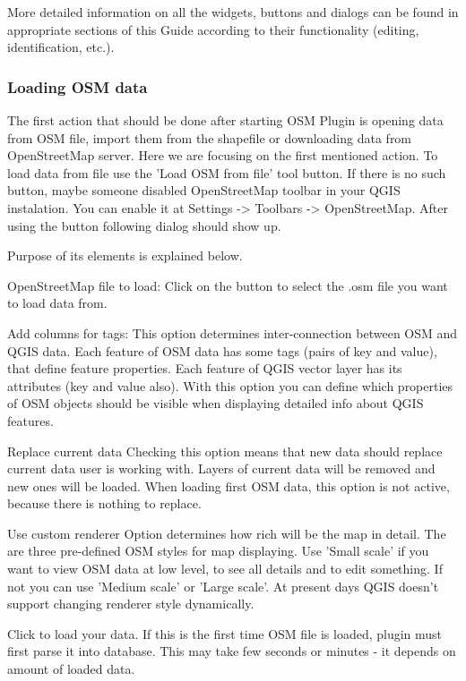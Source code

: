 More detailed information on all the widgets, buttons and dialogs can be
found in appropriate sections of this Guide according to their functionality
(editing, identification, etc.).

\subsubsection{Loading OSM data}

The first action that should be done after starting OSM Plugin is opening
data from OSM file, import them from the shapefile or downloading data from
OpenStreetMap server. Here we are focusing on the first mentioned action.
To load data from file use the 'Load OSM from file' tool button. If there
is no such button, maybe someone disabled OpenStreetMap toolbar in your QGIS
instalation. You can enable it at Settings -> Toolbars -> OpenStreetMap.
After using the button following dialog should show up.

Purpose of its elements is explained below.

\begin{description}
\item OpenStreetMap file to load: Click on the button to select the .osm file you want to load data from.
\item Add columns for tags: This option determines inter-connection between OSM and QGIS data. Each
feature of OSM data has some tags (pairs of key and value), that define
feature properties. Each feature of QGIS vector layer has its attributes (key
and value also). With this option you can define which properties of OSM
objects should be visible when displaying detailed info about QGIS features.
\item Replace current data
Checking this option means that new data should replace current data user is
working with. Layers of current data will be removed and new ones will be
loaded. When loading first OSM data, this option is not active, because there
is nothing to replace.
\item Use custom renderer
Option determines how rich will be the map in detail. The are three
pre-defined OSM styles for map displaying. Use 'Small scale' if you want to
view OSM data at low level, to see all details and to edit something. If not
you can use 'Medium scale' or 'Large scale'. At present days QGIS doesn't
support changing renderer style dynamically.
\end{description}

Click  to load your data. If this is the first time OSM 
file is loaded, plugin must first parse it into database.
This may take few seconds or minutes - it depends on amount of loaded data.

